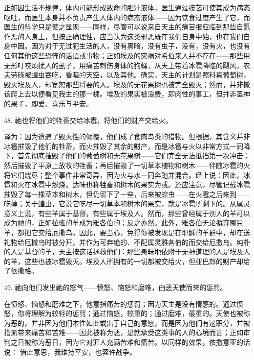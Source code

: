 正如因生活不规律，体内可能形成致命的胆汁液体，医生通过技艺可使其成为病态呕吐，而医生本身并不负责产生人体内的病态液体——因为饮食过度产生了它，而医生的科学只是使之显现——同样，尽管可以说来自天主的痛苦报应临到那些自愿作恶的人身上，但按正确理性，应当认为这类邪恶既在我们自身中始，也在我们自身中因。因为对于无过犯生活的人，没有黑暗，没有虫子，没有，没有火，也没有任何其他这些恐怖的话语或事物；正如埃及的灾祸对希伯来人并不存在——那些用无形叮咬烦扰人的虱子，用痛苦刺伤身体的狗蝇，从天上带着冰雹降临的飓风，农夫劳碌被蝗虫吞吃，昏暗的天空，以及其他。确实，天主的计划是照料真葡萄树，毁灭埃及人，却宽恕那些将要的人。埃及的无花果树也被完全毁灭；然而，并非撒该爬上去以便看见我主的那一棵。埃及的果实被浪费，即肉性的事工，但并非圣神的果子，即爱、喜乐与平安。\par

48. 祂也将他们的牲畜交给冰雹，将他们的财产交给火。\par

译为：因为遭遇了毁灭性的倾覆，他们成了食肉鸟类的猎物。但根据，其含义并非冰雹摧毁了他们的牲畜，而火摧毁了其余的财产，而是冰雹与火以非常方式一同降下，首先彻底摧毁了他们的葡萄树和无花果树——它们完全无法抵挡第一次冲击；然后摧毁了平原上放牧的牲畜；再后摧毁了一切草本植物和树木——伴随冰雹的火将它们烧尽；整个事件非常奇异，因为火与水一同奔跑并混合。经上说：因此，冰雹和火在冰雹中燃烧。达味也称牲畜和树木的果实为或。还应注意，尽管记载冰雹摧毁了每一棵草本和树木，但仍留下了一些，后来被蝗虫——在火雹之后来到——吃掉；关于蝗虫，它说它吃尽一切草本和树木的果实，就是冰雹所剩下的。从属灵意义上说，有些羊属于基督，有些属于埃及人。然而，那些曾经属于别人的羊可以成为祂的，正如拉班的羊成为雅各伯的；反之亦然。此外，雅各伯无论摒弃哪只羊，都把它交给厄撒乌。因此，要当心，免得你被发现是在耶稣的羊群中，却在送礼物给厄撒乌时被分开，并作为可弃绝的、不配属灵雅各伯的而交给厄撒乌。纯朴的人是基督的羊，天主按这话拯救他们：那些愚昧地依附于无神道理的人是埃及人的羊，这些也被冰雹毁灭。埃及人所拥有的一切都被交给火，但亚巴郎的财产却给了依撒格。\par

49. 祂向他们发出祂的怒气——愤怒、恼怒和磨难，由恶天使而来的惩罚。\par

在愤怒、恼怒和磨难之下，他意指痛苦的惩罚；因为天主是没有情感的。通过愤怒，你将理解为较轻的惩罚；通过恼怒，较重的；通过磨难，最重的。天使也被称为恶的，并非因为他们本性如此或出于自己的意愿，而是因为他们有这职分，并被指派带来痛苦和苦难——因此被称为恶，是就承受这类事的人的心境而言；正如审判之日被称为恶日，因为它对罪人充满苦难和痛苦。以同样的效果，依撒意亚的话说： 借此意思，我维持平安，也容许战争。\par

